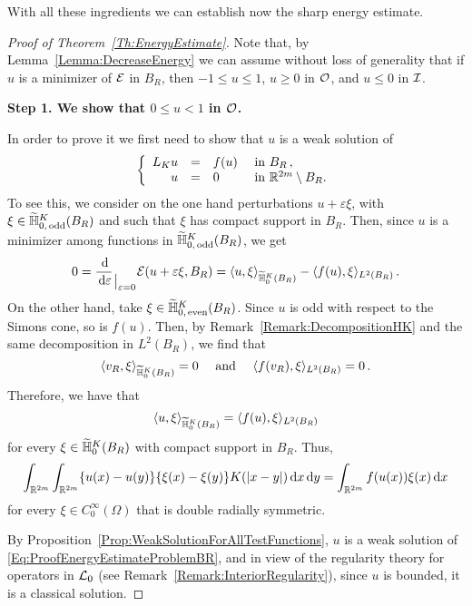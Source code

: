 With all these ingredients we can establish now the sharp energy estimate.

\begin{proof}[Proof of Theorem~\ref{Th:EnergyEstimate}]

Note that, by Lemma~\ref{Lemma:DecreaseEnergy}  we can assume without loss of generality that if $u$ is a minimizer of $\mathcal{E}$ in $B_R$, then $-1 \leq u \leq 1$, $u \geq 0$ in $\mathcal{O}$, and $u \leq 0$ in $\mathcal{I}$. 

\textbf{Step 1. We show that $0\leq u < 1$ in $\mathcal{O}$.} 

In order to prove it we first need to show that $u$ is a weak solution of
\begin{equation}
\label{Eq:ProofEnergyEstimateProblemBR}
	\left\{\begin{array}{rcll}
	L_K  u &=& f(u) & \textrm{ in } B_R\,,\\
	u &=& 0 & \textrm{ in }\mathbb{R}^{2m} \setminus B_R.
	\end{array} \right.
\end{equation}
To see this, we consider on the one hand perturbations $u +  \varepsilon \xi$, with $\xi \in \widetilde{\mathbb{H}}^K_{0, \,\mathrm{odd}}(B_R)$ and such that $\xi$ has compact support in $B_R$. Then, since $u$ is a minimizer among functions in $\widetilde{\mathbb{H}}^K_{0, \,\mathrm{odd}}(B_R)$, we get
$$
0 = \dfrac{\,\mathrm{d}}{\,\mathrm{d} \varepsilon}_{\mkern1.5mu\big\vert_{\scriptstyle \varepsilon = 0}} \mathcal{E}(u +  \varepsilon \xi, B_R) = \langle u,\xi \rangle_{\widetilde{\mathbb{H}}^K_0(B_R)} - \langle f(u),\xi \rangle_{L^2(B_R)}\,.
$$
On the other hand, take $\xi \in \widetilde{\mathbb{H}}^K_{0, \,\mathrm{even}}(B_R)$. Since $u$ is odd with respect to the Simons cone, so is $f(u)$. Then, by Remark~\ref{Remark:DecompositionHK} and the same decomposition in $L^2(B_R)$, we find that
$$
\langle v_R,\xi \rangle_{\widetilde{\mathbb{H}}^K_0(B_R)} = 0 \quad \textrm{ and } \quad  \langle f(v_R),\xi \rangle_{L^2(B_R)} = 0\,.
$$
Therefore, we have that
$$
\langle u,\xi \rangle_{\widetilde{\mathbb{H}}^K_0(B_R)} = \langle f(u),\xi \rangle_{L^2(B_R)}
$$
for every $\xi \in\widetilde{\mathbb{H}}^K_0(B_R)$ with compact support in  $B_R$. Thus,
$$
\int_{\mathbb{R}^{2m}}\int_{\mathbb{R}^{2m}} \{u(x)-u(y)\}\{\xi(x)-\xi(y)\} K(|x-y|) \,\mathrm{d} x \,\mathrm{d} y = \int_{\mathbb{R}^{2m}} f(u(x)) \xi(x) \,\mathrm{d} x
$$
for every $\xi \in C^\infty_0(\Omega)$ that is double radially symmetric. 

By Proposition~\ref{Prop:WeakSolutionForAllTestFunctions}, $u$ is a weak solution of \eqref{Eq:ProofEnergyEstimateProblemBR}, and in view of the regularity theory for operators in $\mathcal{L}_0$ (see Remark~\ref{Remark:InteriorRegularity}), since $u$ is bounded, it is a classical solution.


\end{proof}
